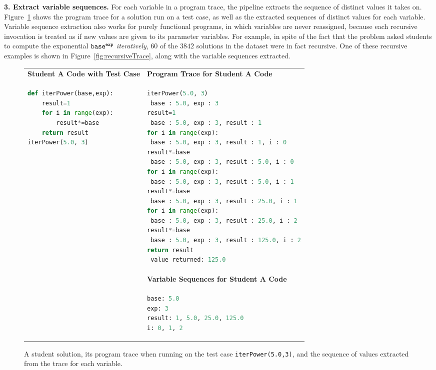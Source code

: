 {\bf 3. Extract variable sequences.} For each variable in a program trace, the pipeline extracts the sequence of distinct values it takes on. Figure~\ref{fig:extractsequence} shows the program trace for a solution run on a test case, as well as the extracted sequences of distinct values for each variable. Variable sequence extraction also works for purely functional programs, in which variables are never reassigned, because each recursive invocation is treated as if new values are given to its parameter variables. For example, in spite of the fact that the  problem asked students to compute the exponential $\texttt{base}^{\texttt{exp}}$ \textit{iteratively}, $60$ of the $3842$  solutions in the dataset were in fact recursive. One of these recursive examples is shown in Figure~\ref{fig:recursiveTrace}, along with the variable sequences extracted.
\begin{figure}
\begin{tabular}{ll}
{\bf Student A Code with Test Case} & {\bf Program Trace for Student A Code} \\
\begin{minipage}{0.35\linewidth}
\begin{lstlisting}[basicstyle=\linespread{1.0}\ttfamily\footnotesize,language=python]
def iterPower(base,exp):
    result=1
    for i in range(exp):
        result*=base
    return result
iterPower(5.0, 3)
\end{lstlisting}
\end{minipage} &
\begin{minipage}{0.6\linewidth}
\begin{lstlisting}[basicstyle=\linespread{1.0}\ttfamily\footnotesize,language=python,linebackgroundcolor={\lstcolorlines[gray!20]{2,4,6,8,10,12,14,16,18}}]
iterPower(5.0, 3)
 base : 5.0, exp : 3
result=1
 base : 5.0, exp : 3, result : 1 
for i in range(exp):
 base : 5.0, exp : 3, result : 1, i : 0
result*=base
 base : 5.0, exp : 3, result : 5.0, i : 0 
for i in range(exp):
 base : 5.0, exp : 3, result : 5.0, i : 1
result*=base 
 base : 5.0, exp : 3, result : 25.0, i : 1 
for i in range(exp):
 base : 5.0, exp : 3, result : 25.0, i : 2 
result*=base
 base : 5.0, exp : 3, result : 125.0, i : 2
return result
 value returned: 125.0
\end{lstlisting}
\end{minipage} 
\\
& {\bf Variable Sequences for Student A Code} \\
&
\begin{minipage}{0.6\linewidth}
\begin{lstlisting}[language=python]
base: 5.0
exp: 3
result: 1, 5.0, 25.0, 125.0
i: 0, 1, 2
\end{lstlisting}
\end{minipage}
\end{tabular}
\caption{A student solution, its program trace when running on the test case \texttt{iterPower(5.0,3)}, and the sequence of values extracted from the trace for each variable.}
\label{fig:extractsequence}
\end{figure}

